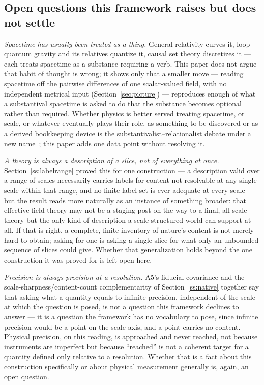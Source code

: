 \documentclass[pdflatex,sn-mathphys-num]{sn-jnl}
\theoremstyle{thmstyleone}
\theoremstyle{thmstylethree}
\theoremstyle{thmstyletwo}
\begin{document}
\subsection{Open questions this framework raises but does not settle}

\emph{Spacetime has usually been treated as a thing.} General relativity
curves it, loop quantum gravity and its relatives quantize it, causal
set theory discretizes it — each treats spacetime as a substance
requiring a verb. This paper does not argue that habit of thought is
wrong; it shows only that a smaller move — reading spacetime off the
pairwise differences of one scalar-valued field, with no independent
metrical input (Section~\ref{sec:picture}) — reproduces enough of what a
substantival spacetime is asked to do that the substance becomes
optional rather than required. Whether physics is better served treating
spacetime, or scale, or whatever eventually plays their role, as
something to be discovered or as a derived bookkeeping device is the
substantivalist–relationalist debate under a new name~\cite{Earman1989};
this paper adds one data point without resolving it.

\emph{A theory is always a description of a slice, not of everything at
once.} Section~\ref{ss:labelrange} proved this for one construction — a
description valid over a range of scales necessarily carries labels for
content not resolvable at any single scale within that range, and no
finite label set is ever adequate at every scale — but the result reads
more naturally as an instance of something broader: that effective field
theory may not be a staging post on the way to a final, all-scale theory
but the only kind of description a scale-structured world can support at
all. If that is right, a complete, finite inventory of nature's content
is not merely hard to obtain; asking for one is asking a single slice
for what only an unbounded sequence of slices could give. Whether that
generalization holds beyond the one construction it was proved for is
left open here.

\emph{Precision is always precision at a resolution.} A5's fiducial
covariance and the scale-sharpness/content-count complementarity of
Section~\ref{ss:native} together say that asking what a quantity equals
to infinite precision, independent of the scale at which the question is
posed, is not a question this framework declines to answer — it is a
question the framework has no vocabulary to pose, since infinite
precision would be a point on the scale axis, and a point carries no
content. Physical precision, on this reading, is approached and never
reached, not because instruments are imperfect but because ``reached''
is not a coherent target for a quantity defined only relative to a
resolution. Whether that is a fact about this construction specifically
or about physical measurement generally is, again, an open question.
\end{document}
